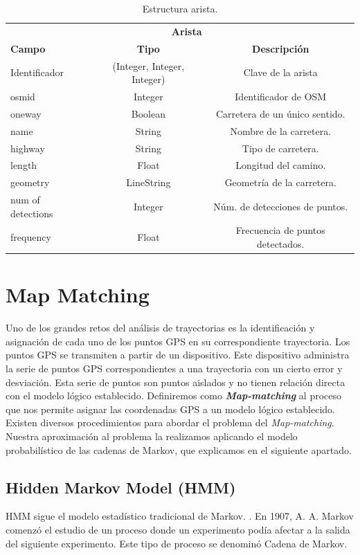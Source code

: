 \begin{table}[h]
\centering
\begin{tabular}{l | c | c } 
\toprule
\multicolumn{2}{r}{\textbf{Arista}} \\ 
\cmidrule(r){1-3}
{\textbf{Campo}} &  {\textbf{Tipo}} & {\textbf{Descripción}} \\
\cmidrule(r){1-3}
{Identificador}  & (Integer, Integer, Integer)  & {Clave de la arista}\\
{osmid}  & Integer  & Identificador de \ac{OSM} \\
{oneway} &  Boolean & Carretera de un único sentido. \\
{name} & String & Nombre de la carretera. \\
{highway} & String & Tipo de carretera. \\
{length} & Float & Longitud del camino. \\
{geometry} & LineString & Geometría de la carretera. \\
{num of detections} & Integer & Núm. de detecciones de puntos. \\
{frequency} & Float & Frecuencia de puntos detectados. \\
\bottomrule
\end{tabular}
\caption{Estructura arista.}
\label{TablaArista}
\end{table}

\section{Map Matching}\label{section: MapMatching}
Uno de los grandes retos del análisis de trayectorias es la identificación y asignación de cada uno de los 
puntos GPS en su correspondiente trayectoria. Los puntos GPS se transmiten a partir de un dispositivo. 
Este dispositivo administra la serie de puntos GPS correspondientes a una trayectoria con un cierto error 
y desviación. Esta serie de puntos son puntos aislados y no tienen relación directa con el modelo lógico 
establecido.
Definiremos como \textbf{\textit{Map-matching}} al proceso que nos permite asignar las coordenadas 
GPS a un modelo lógico establecido.
Existen diversos procedimientos para abordar el problema del \textit{Map-matching}. Nuestra 
aproximación al problema la realizamos aplicando el modelo probabilístico de las cadenas de Markov, 
que explicamos en el siguiente apartado.

\subsection{Hidden Markov Model (\ac{HMM})}
\ac{HMM} sigue el modelo estadístico tradicional de Markov. \cite{Malvar08}. En 1907, A. A. Markov 
comenzó el estudio de un proceso donde un experimento podía afectar a la salida del siguiente 
experimento. Este tipo de proceso se denominó Cadena de Markov. 


